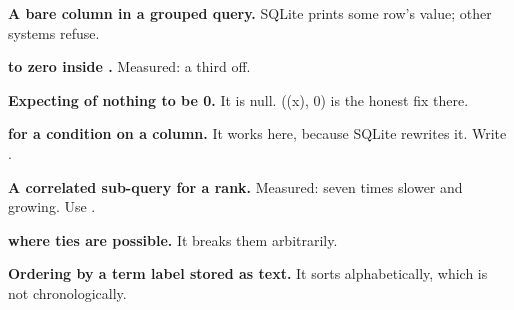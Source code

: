 \begin{pitfall}
\begin{tight}
  \item \textbf{A bare column in a grouped query.} SQLite prints some row's
        value; other systems refuse.
  \item \textbf{ to zero inside .} Measured: a third
        off.
  \item \textbf{Expecting  of nothing to be 0.} It is null.
        ((x), 0) is the honest fix there.
  \item \textbf{ for a condition on a column.} It works here,
        because SQLite rewrites it. Write .
  \item \textbf{A correlated sub-query for a rank.} Measured: seven times
        slower and growing. Use  .
  \item \textbf{ where ties are possible.} It breaks them
        arbitrarily.
  \item \textbf{Ordering by a term label stored as text.} It sorts
        alphabetically, which is not chronologically.
\end{tight}
\end{pitfall}

